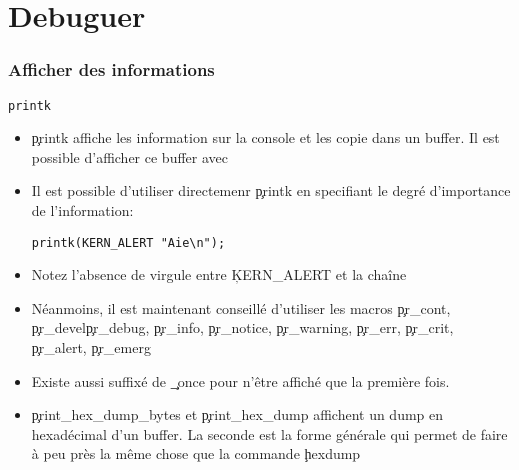%
%
%

\part{Debuguer}

\begin{frame}
  \partpage
\end{frame}

\begin{frame}
  \tableofcontents
\end{frame}

\section{Afficher des informations}

\begin{frame}[fragile=singleslide]{\texttt{printk}}
  \begin{itemize} 
  \item \c{printk} affiche les information sur la console et les copie
    dans  un  buffer.   Il  est  possible d'afficher  ce  buffer  avec
  \item   Il  est  possible   d'utiliser  directemenr   \c{printk}  en
    specifiant le degré d'importance de l'information:
    \begin{lstlisting} 
printk(KERN_ALERT "Aie\n");
    \end{lstlisting} 
  \item Notez l'absence de virgule entre \c{KERN_ALERT} et la chaîne
  \item Néanmoins,  il est maintenant conseillé  d'utiliser les macros
    \c{pr_cont}, \c{pr_devel}\c{pr_debug}, \c{pr_info}, \c{pr_notice},
    \c{pr_warning},     \c{pr_err},     \c{pr_crit},     \c{pr_alert},
    \c{pr_emerg}
  \item Existe aussi  suffixé de \c{_once} pour n'être  affiché que la
    première fois.
  \item  \c{print_hex_dump_bytes} et  \c{print_hex_dump}  affichent un
    dump en hexadécimal d'un buffer.  La seconde est la forme générale
    qui  permet de  faire à  peu près  la même  chose que  la commande
    \c{hexdump}
  \end{itemize}
\end{frame}

